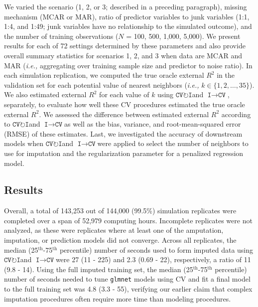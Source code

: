 \documentclass[AMA,STIX1COL,doublespace]{WileyNJD-v2}
\begin{document}
We varied the scenario (1, 2, or 3; described in a preceding paragraph),
missing mechanism (MCAR or MAR), ratio of predictor variables to junk
variables (1:1, 1:4, and 1:49; junk variables have no relationship to
the simulated outcome), and the number of training observations (\(N\) =
100, 500, 1,000, 5,000). We present results for each of 72 settings
determined by these parameters and also provide overall summary
statistics for scenarios 1, 2, and 3 when data are MCAR and MAR
(\textit{i.e., }aggregating over training sample size and predictor to
noise ratio). In each simulation replication, we computed the true
oracle external \(R^2\) in the validation set for each potential value
of nearest neighbors
(\textit{i.e., }\(k \in \lbrace 1, 2, \ldots, 35 \rbrace\)). We also
estimated external \(R^2\) for each value of \(k\) using
$\texttt{CV}\!\circlearrowright\!\texttt{I}$\space and
$\texttt{I}\!\!\rightarrow\!\texttt{CV}$, separately, to evaluate how
well these CV procedures estimated the true oracle external \(R^2\). We
assessed the difference between estimated external \(R^2\) according to
$\texttt{CV}\!\circlearrowright\!\texttt{I}$\space and
$\texttt{I}\!\!\rightarrow\!\texttt{CV}$\space as well as the bias,
variance, and root-mean-squared error (RMSE) of these estimates. Last,
we investigated the accuracy of downstream models when
$\texttt{CV}\!\circlearrowright\!\texttt{I}$\space and
$\texttt{I}\!\!\rightarrow\!\texttt{CV}$\space were applied to select
the number of neighbors to use for imputation and the regularization
parameter for a penalized regression model.

\subsection{Results} \label{subsec:sim_results}

Overall, a total of 143,253 out of 144,000 (99.5\%) simulation
replicates were completed over a span of 52,979 computing hours.
Incomplete replicates were not analyzed, as these were replicates where
at least one of the amputation, imputation, or prediction models did not
converge. Across all replicates, the median
(25\(^{\text{th}}\)-75\(^{\text{th}}\) percentile) number of seconds
used to form imputed data using
$\texttt{CV}\!\circlearrowright\!\texttt{I}$\space and
$\texttt{I}\!\!\rightarrow\!\texttt{CV}$\space were 27 (11 - 225) and
2.3 (0.69 - 22), respectively, a ratio of 11 (9.8 - 14). Using the full
imputed training set, the median (25\(^{\text{th}}\)-75\(^{\text{th}}\)
percentile) number of seconds needed to tune \texttt{glmnet} models
using CV and fit a final model to the full training set was 4.8 (3.3 -
55), verifying our earlier claim that complex imputation procedures
often require more time than modeling procedures.
\end{document}
